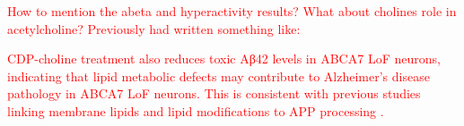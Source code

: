 \textcolor{red}{How to mention the abeta and hyperactivity results? What about cholines role in acetylcholine? Previously had written something like:}

\textcolor{red}{CDP-choline treatment also reduces toxic Aβ42 levels in ABCA7 LoF neurons, indicating that lipid metabolic defects may contribute to Alzheimer’s disease pathology in ABCA7 LoF neurons. This is consistent with previous studies linking membrane lipids and lipid modifications to APP processing \cite{Bhattacharyya2016-rs,Walter2013-qu}.}